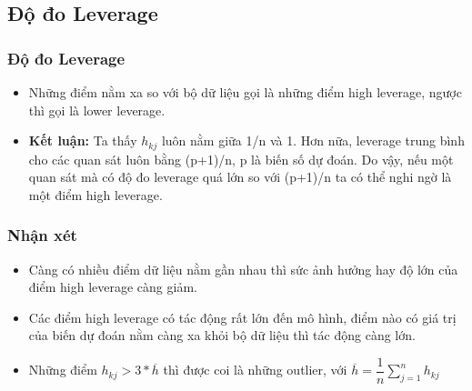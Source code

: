\subsection{Độ đo Leverage}
\begin{frame}
\frametitle{Độ đo Leverage}
	\begin{itemize}
    \begin{block}{Định nghĩa}
    \textbf{Leverage} là độ đo khoảng cách giữa một điểm dữ liệu và phần còn lại của bộ dữ liệu dựa trên miền giá trị của bộ dữ liệu, được xác định bởi công thức:
    $$ h_{k j}=\frac{1}{n}+\frac{\left(z_{kj}-\overline{z}\right)^{2}}{\sum_{j=1}^{n}\left(z_{kj}-\overline{z}\right)^{2}}$$
    \end{block}
    \item Những điểm nằm xa so với bộ dữ liệu gọi là những điểm high leverage, ngược thì gọi là lower leverage.
    \item \textbf{Kết luận:} Ta thấy $h_{kj}$ luôn nằm giữa 1/n và 1. Hơn nữa, leverage trung bình cho các quan sát luôn bằng (p+1)/n, p là biến số dự đoán. Do vậy, nếu một quan sát mà có độ đo leverage quá lớn so với (p+1)/n ta có thể nghi ngờ là một điểm high leverage.
\end{itemize}
\end{frame}
\begin{frame}
\frametitle{Nhận xét}
\begin{itemize}
   \item Càng có nhiều điểm dữ liệu nằm gần nhau thì sức ảnh hưởng hay độ lớn của điểm high leverage càng giảm.
   \item Các điểm high leverage có tác động rất lớn đến mô hình, điểm nào có giá trị của biến dự đoán nằm càng xa khỏi bộ dữ liệu thì tác động càng lớn.
   \item Những điểm $h_{kj} > 3*\overline{h}$ thì được coi là những outlier, với $\overline{h} = \dfrac{1}{n}\sum_{j=1}^n{h_{kj}}$
\end{itemize}
\end{frame}
